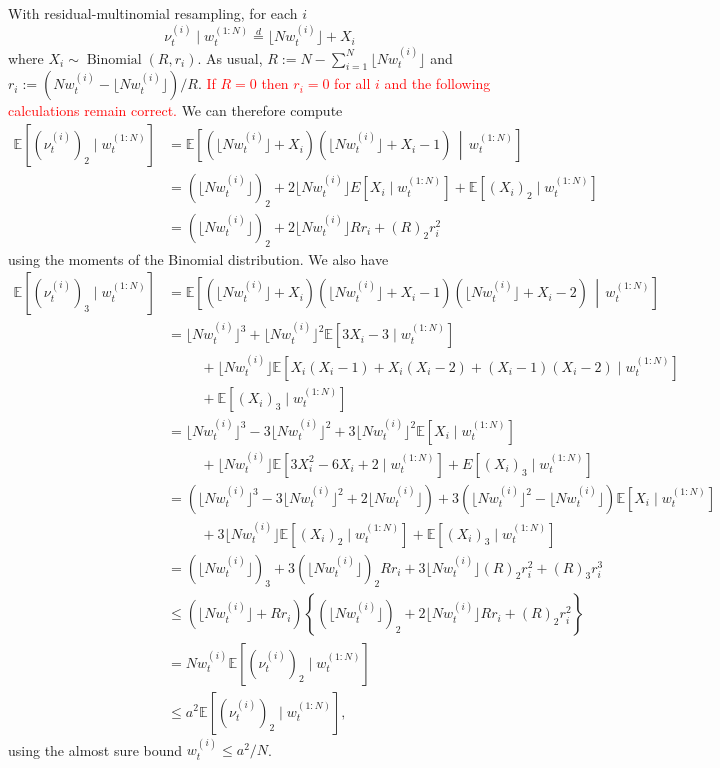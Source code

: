 \documentclass{article}
\newcommand{\eqdist}{\overset{d}{=}}
\newcommand{\E}{\mathbb{E}}
\newcommand{\1}[1]{\mathbbm{1}_{#1}}
\newcommand{\flnw}[1][i]{\lfloor N w_t^{(#1)} \rfloor}
\newcommand{\midd}{\,\middle|\,} %
\newcommand{\Bin}{\operatorname{Binomial}}
\newcommand{\seb}[1]{\xspace\textcolor{red}{#1}\xspace}
\begin{document}
With residual-multinomial resampling, for each $i$
\begin{equation*}
\nu_t^{(i)} \mid w_t^{(1:N)}
\eqdist \flnw + X_i
\end{equation*}
where $X_i \sim \Bin(R, r_i)$. As usual, $R := N - \sum_{i=1}^N \flnw$ and $r_i := ( Nw_t^{(i)} - \flnw ) /R$.
\seb{If $R=0$ then $r_i = 0$ for all $i$ and the following calculations remain correct.}
We can therefore compute
\begin{align*}
\E [ (\nu_t^{(i)})_2 \mid w_t^{(1:N)} ]
&= \E\left[ (\flnw + X_i) (\flnw + X_i -1) \midd w_t^{(1:N)} \right] \\
&= (\flnw)_2 + 2\flnw E[ X_i \mid w_t^{(1:N)} ] + \E[ (X_i)_2 \mid w_t^{(1:N)} ] \\
&= (\flnw)_2 + 2\flnw R r_i + (R)_2 r_i^2
\end{align*}
using the moments of the Binomial distribution.
We also have
\begin{align*}
\E [ (\nu_t^{(i)})_3 \mid w_t^{(1:N)} ]
&= \E\left[ (\flnw + X_i) (\flnw + X_i -1) (\flnw + X_i -2) \midd w_t^{(1:N)} \right] \\
&= \flnw^3 + \flnw^2 \E[ 3X_i -3 \mid w_t^{(1:N)} ] \\
    &\hspace{1cm}+ \flnw 
        \E[ X_i(X_i-1) + X_i(X_i-2) + (X_i-1)(X_i-2) \mid w_t^{(1:N)} ] \\
    &\hspace{1cm}+ \E[ (X_i)_3 \mid w_t^{(1:N)} ] \\
&= \flnw^3 - 3\flnw^2 +3\flnw^2 \E[ X_i \mid w_t^{(1:N)} ] \\
    &\hspace{1cm}+ \flnw \E[ 3X_i^2 - 6X_i +2 \mid w_t^{(1:N)} ] 
        + E[(X_i)_3 \mid w_t^{(1:N)} ]\\
&= \left( \flnw^3 - 3\flnw^2 + 2\flnw \right)
        + 3 \left( \flnw^2 - \flnw \right) \E[ X_i \mid w_t^{(1:N)} ] \\
    &\hspace{1cm}+ 3 \flnw \E[ (X_i)_2 \mid w_t^{(1:N)} ] 
        + \E[ (X_i)_3 \mid w_t^{(1:N)} ] \\
&= (\flnw)_3 + 3(\flnw)_2 R r_i + 3\flnw (R)_2 r_i^2 + (R)_3 r_i^3 \\
&\leq \left( \flnw + R r_i \right) \left\{ (\flnw)_2 + 2\flnw R r_i 
        + (R)_2 r_i^2 \right\} \\
&= Nw_t^{(i)} \E[(\nu_t^{(i)})_2 \mid w_t^{(1:N)} ] \\
&\leq a^2 \E[(\nu_t^{(i)})_2 \mid w_t^{(1:N)} ] ,
\end{align*}
using the almost sure bound $w_t^{(i)} \leq a^2/N$.
\end{document}
